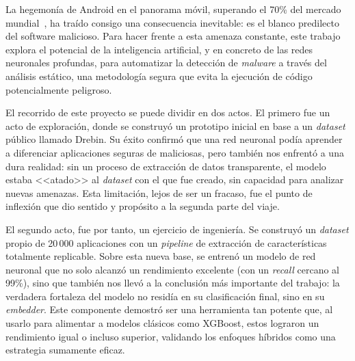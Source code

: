 
La hegemonía de Android en el panorama móvil, superando el 70\% del mercado mundial~\cite{statcounterAndroid2025}, ha traído consigo una consecuencia inevitable: es el blanco predilecto del software malicioso. Para hacer frente a esta amenaza constante, este trabajo explora el potencial de la inteligencia artificial, y en concreto de las redes neuronales profundas, para automatizar la detección de \textit{malware} a través del análisis estático, una metodología segura que evita la ejecución de código potencialmente peligroso.

El recorrido de este proyecto se puede dividir en dos actos. El primero fue un acto de exploración, donde se construyó un prototipo inicial en base a un \textit{dataset} público llamado Drebin. Su éxito confirmó que una red neuronal podía aprender a diferenciar aplicaciones seguras de maliciosas, pero también nos enfrentó a una dura realidad: sin un proceso de extracción de datos transparente, el modelo estaba <<atado>> al \textit{dataset} con el que fue creado, sin capacidad para analizar nuevas amenazas. Esta limitación, lejos de ser un fracaso, fue el punto de inflexión que dio sentido y propósito a la segunda parte del viaje.

El segundo acto, fue por tanto, un ejercicio de ingeniería. Se construyó un \textit{dataset} propio de 20\,000 aplicaciones con un \textit{pipeline} de extracción de características totalmente replicable. Sobre esta nueva base, se entrenó un modelo de red neuronal que no solo alcanzó un rendimiento excelente (con un \textit{recall} cercano al 99\%), sino que también nos llevó a la conclusión más importante del trabajo: la verdadera fortaleza del modelo no residía en su clasificación final, sino en su \textit{embedder}. Este componente demostró ser una herramienta tan potente que, al usarlo para alimentar a modelos clásicos como XGBoost, estos lograron un rendimiento igual o incluso superior, validando los enfoques híbridos como una estrategia sumamente eficaz.